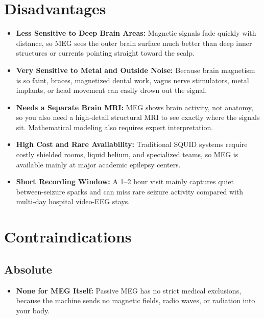 \section{Disadvantages}
\begin{itemize}
  \item \textbf{Less Sensitive to Deep Brain Areas:} Magnetic signals fade quickly with distance, so MEG sees the outer brain surface much better than deep inner structures or currents pointing straight toward the scalp.
  \item \textbf{Very Sensitive to Metal and Outside Noise:} Because brain magnetism is so faint, braces, magnetized dental work, vagus nerve stimulators, metal implants, or head movement can easily drown out the signal.
  \item \textbf{Needs a Separate Brain MRI:} MEG shows brain activity, not anatomy, so you also need a high-detail structural MRI to see exactly where the signals sit. Mathematical modeling also requires expert interpretation.
  \item \textbf{High Cost and Rare Availability:} Traditional SQUID systems require costly shielded rooms, liquid helium, and specialized teams, so MEG is available mainly at major academic epilepsy centers.
  \item \textbf{Short Recording Window:} A 1--2 hour visit mainly captures quiet between-seizure sparks and can miss rare seizure activity compared with multi-day hospital video-EEG stays.
\end{itemize}

\section{Contraindications}

\subsection{Absolute}
\begin{itemize}
  \item \textbf{None for MEG Itself:} Passive MEG has no strict medical exclusions, because the machine sends no magnetic fields, radio waves, or radiation into your body.
\end{itemize}

